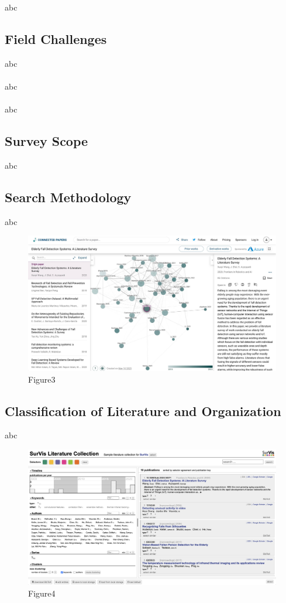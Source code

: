 \documentclass[12pt]{article}
\begin{document}
\noindent abc

\subsection{Field Challenges}

abc
\\ \hspace*{\fill} \\
abc
\\ \hspace*{\fill} \\
abc

\subsection{Survey Scope}

abc

\subsection{Search Methodology}

abc

\begin{figure}[H]
\centering
\includegraphics[width=1\textwidth]{connected-paper.pic.jpg}
\caption{Figure3} 
\end{figure}

\subsection{Classification of Literature and Organization}

abc

\begin{figure}[H]
\centering
\includegraphics[width=1\textwidth]{survis.pic.jpg}
\caption{Figure4} 
\end{figure}
\end{document}
